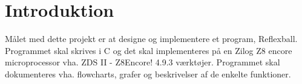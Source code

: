 \section{Introduktion}
Målet med dette projekt er at designe og implementere et program, Reflexball. Programmet skal skrives i C og det skal implementeres på en Zilog Z8 encore microprocessor vha. ZDS II - Z8Encore! 4.9.3 værktøjer. Programmet skal dokumenteres vha. flowcharts, grafer og beskrivelser af de enkelte funktioner.

\